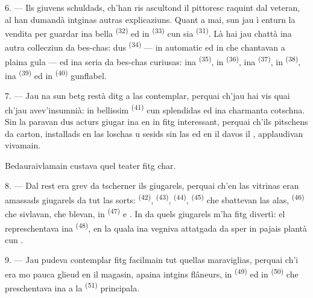 6. --- Ils giuvens schuldads, ch'han ris ascultond il pittoresc raquint dal veteran,
al han dumandà intginas autras explicaziuns. Quant a mai, sun jau ì enturn la vendita
per guardar ina bella  \textsuperscript{(32)} ed in 
\textsuperscript{(33)} cun sia  \textsuperscript{(31)}. Là hai jau chattà ina
autra collecziun da bes-chas: dus  \textsuperscript{(34)} --- in
 automatic ed in  che chantavan a plaina gula --- ed
ina seria da bes-chas curiusas: ina  \textsuperscript{(35)}, in 
\textsuperscript{(36)}, ina  \textsuperscript{(37)}, in 
\textsuperscript{(38)}, ina  \textsuperscript{(39)} ed in 
\textsuperscript{(40)} gunflabel.

7. --- Jau na sun betg restà ditg a las contemplar, perquai ch'jau hai vis quai
ch'jau avev'insumnià: in bellissim  \textsuperscript{(41)} cun
splendidas  ed ina charmanta  cotschna. Sin la
 paravan dus acturs giugar ina  en in  fitg
interessant, perquai ch'ils pitschens  da carton, installads en las
loschas u sesids sin las  ed en il  davos il
, applaudivan vivamain.

Bedauraivlamain custava quel teater fitg char.

8. --- Dal rest era grev da tscherner ils giugarels, perquai ch'en las vitrinas eran
amassads giugarels da tut las sorts:  \textsuperscript{(42)},
 \textsuperscript{(43)},  \textsuperscript{(44)},
 \textsuperscript{(45)} che sbattevan las alas, 
\textsuperscript{(46)} che sivlavan,  che blevan, in 
\textsuperscript{(47)} e . In da quels giugarels m'ha fitg
divertì: el represchentava ina  \textsuperscript{(48)}, en la quala
ina  vegniva attatgada da  sper in pajais plantà cun
.


9. --- Jau pudeva contemplar fitg facilmain tut quellas maraviglias, perquai ch'i era
mo pauca glieud en il magasin, apaina intgins flâneurs, in 
\textsuperscript{(49)} ed in  \textsuperscript{(50)} che preschentava ina
 a la  \textsuperscript{(51)} principala.

